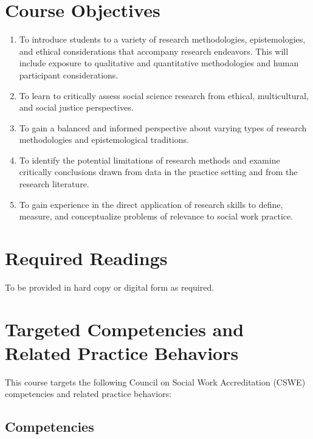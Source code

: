 \documentclass[11pt,]{article}
\providecommand{\tightlist}{%
  \setlength{\itemsep}{0pt}\setlength{\parskip}{0pt}}
\begin{document}
\section{Course Objectives}\label{course-objectives}

\begin{enumerate}
\def\labelenumi{\arabic{enumi}.}
\tightlist
\item
  To introduce students to a variety of research methodologies,
  epistemologies, and ethical considerations that accompany research
  endeavors. This will include exposure to qualitative and quantitative
  methodologies and human participant considerations.
\item
  To learn to critically assess social science research from ethical,
  multicultural, and social justice perspectives.
\item
  To gain a balanced and informed perspective about varying types of
  research methodologies and epistemological traditions.
\item
  To identify the potential limitations of research methods and examine
  critically conclusions drawn from data in the practice setting and
  from the research literature.
\item
  To gain experience in the direct application of research skills to
  define, measure, and conceptualize problems of relevance to social
  work practice.
\end{enumerate}

\section{Required Readings}\label{required-readings}

To be provided in hard copy or digital form as required.

\section{Targeted Competencies and Related Practice
Behaviors}\label{targeted-competencies-and-related-practice-behaviors}

This course targets the following Council on Social Work Accreditation
(CSWE) competencies and related practice behaviors:

\subsection{Competencies}\label{competencies}
\end{document}
